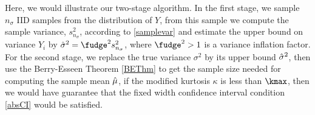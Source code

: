 \documentclass{iitthesis}
\begin{document}
\label{chapter:meanMCabsg}
Here, we would illustrate our two-stage algorithm. In the first stage, we sample $n_\sigma$ IID samples from the distribution of $Y$, from this sample we compute the sample variance, $s_{n_\sigma}^2$, according to \eqref{samplevar} and estimate the upper bound on variance $Y_i$ by $\hsigma^2 = \fudge^2s_{n_{\sigma}}^2$, where $\fudge^2>1$ is a variance inflation factor. For the second stage, we replace the true variance $\sigma^2$ by its upper bound $\hat{\sigma}^2$, then use the Berry-Esseen Theorem \ref{BEThm} to get the sample size needed for computing the sample mean $\hat{\mu}$, if the modified kurtosis $\kappa$ is less than $\kmax$, then we would have guarantee that the fixed width confidence interval condition \eqref{absCI} would be satisfied.
\end{document}
